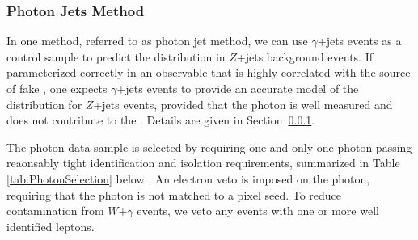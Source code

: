 \subsubsection{Photon Jets Method}
\label{sec:photonjets}

In one method, referred to as photon jet method, we can use
$\gamma$+jets events as a control sample to predict the \met distribution in $Z$+jets
background events. 
If parameterized correctly in an observable that is highly correlated 
with the source of fake \met, one expects $\gamma$+jets events to provide an accurate
model of the \met distribution for $Z$+jets events, provided that the photon
is well measured and does not contribute to the \met. Details are given in Section~\ref{sec:photonjets}. 


The photon data sample is selected by requiring one and only one photon passing reaonsably tight
identification and isolation requirements, summarized in Table \ref{tab:PhotonSelection} below 
\cite{MITHggNote}. 
An electron veto is imposed on the photon, requiring that the photon is not matched to a pixel seed.
To reduce contamination from $W$+$\gamma$ events, we veto any events with one or 
more well identified leptons.


